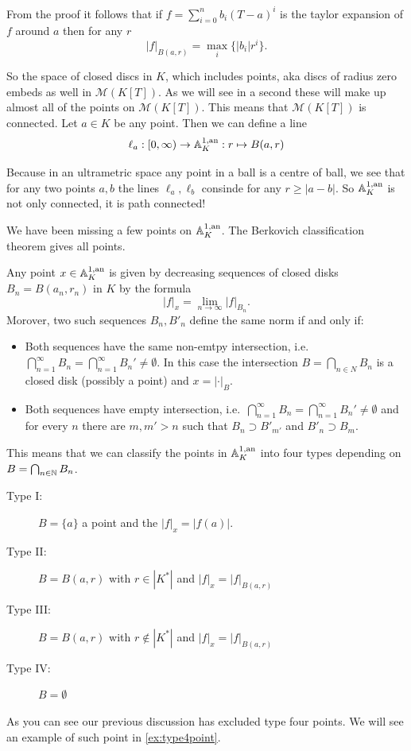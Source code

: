 \begin{remark}\label{rem:norm_disk}
	From the proof it follows that if $f = \sum_{i = 0}^{n} b_i (T-a)^{i}$ is the taylor expansion of $f$ around $a$ then for any $r$
	\[
		|f|_{B(a, r)} = \max_{i}\{  |b_i|r^{i}\}
	.\] 
\end{remark}


So the space of closed discs in $K$, which includes points, aka discs of radius zero embeds as well in $\mathcal{M} (K[T])$. 
As we will see in a second these will make up almost all of the points on $\mathcal{M} (K[T])$. 
This means that $\mathcal{M}(K[T])$ is connected. 
Let $a \in K$ be any point. Then we can define a line \begin{equation}\label{eq:line_in_A_1}
	\ell_a: [0, \infty) \to  \mathbb{A}_K^{1, \text{an}}: r\mapsto B(a, r)
\end{equation}


Because in an ultrametric space any point in a ball is a centre of ball, we see that for any two points $a, b$ the lines $\ell_a, \ell_b$ consinde for any $r \ge |a - b|$. 
So $\mathbb{A}_K^{1,\text{an}}$ is not only connected, it is path connected!

We have been missing a few points on $\mathbb{A}_K^{1, \text{an}}$. 
The Berkovich classification theorem gives all points. 
\begin{theorem}
	 
	Any point $x \in \mathbb{A}_K^{1,\text{an}}$ is given by decreasing sequences of closed disks $B_n = B(a_n, r_n)$ in $K$ by the formula \[
	|f|_x = \lim_{n \to \infty} |f|_{B_n}
	.\] 
	Morover, two such sequences $B_n, B'_n$ define the same norm if and only if:
	 \begin{itemize}
		\item Both sequences have the same non-emtpy intersection, i.e.\ $\bigcap_{n = 1}^{\infty} B_n = \bigcap_{n = 1}^{\infty} B_n' \ne \emptyset$. 
			In this case the intersection $B = \bigcap_{n \in N} B_n$ is a closed disk (possibly a point) and $x = |\cdot |_B$. 
		\item Both sequences have empty intersection, i.e.\ $\bigcap_{n = 1}^{\infty} B_n = \bigcap_{n = 1}^{\infty} B_n' \ne \emptyset$  and for every $n$ there are $m, m'> n$ such that $B_n \supset  B'_{m'}$  and $B'_n \supset B_m $.
	\end{itemize}
	This means that we can classify the points in $\mathbb{A} ^{1,\text{an}}_K$ into four types depending on $B = \bigcap_{n \in \mathbb{N}} B_n$. 
	\begin{description}
		\item[Type I:] $B = \{a\} $ a point and the $|f|_x = |f(a)|$. 
		\item[Type II:] $B = B(a, r)$ with $r \in |K^* |$ and $|f|_x = |f|_{B(a, r)}$
		\item[Type III:] $B = B (a, r)$ with $r \not\in |K^*|$ and $|f|_x = |f|_{B(a, r)}$
		\item[Type IV:] $B = \emptyset$
	\end{description}
\end{theorem}
As you can see our previous discussion has excluded type four points. We will see an example of such point in \cref{ex:type4point}. 

